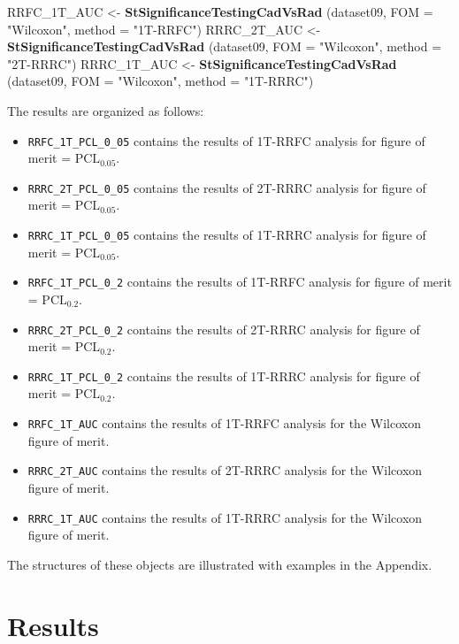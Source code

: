 \documentclass[
]{book}
\newenvironment{Shaded}{\begin{snugshade}}{\end{snugshade}}
\newcommand{\DataTypeTok}[1]{\textcolor[rgb]{0.13,0.29,0.53}{#1}}
\newcommand{\KeywordTok}[1]{\textcolor[rgb]{0.13,0.29,0.53}{\textbf{#1}}}
\newcommand{\NormalTok}[1]{#1}
\newcommand{\StringTok}[1]{\textcolor[rgb]{0.31,0.60,0.02}{#1}}
\begin{document}
\begin{Shaded}
\begin{Highlighting}[]
\NormalTok{RRFC_1T_AUC <-}\StringTok{ }\KeywordTok{StSignificanceTestingCadVsRad}\NormalTok{ (dataset09, }
\DataTypeTok{FOM =} \StringTok{"Wilcoxon"}\NormalTok{, }\DataTypeTok{method =} \StringTok{"1T-RRFC"}\NormalTok{)}
\NormalTok{RRRC_2T_AUC <-}\StringTok{ }\KeywordTok{StSignificanceTestingCadVsRad}\NormalTok{ (dataset09, }
\DataTypeTok{FOM =} \StringTok{"Wilcoxon"}\NormalTok{, }\DataTypeTok{method =} \StringTok{"2T-RRRC"}\NormalTok{)}
\NormalTok{RRRC_1T_AUC <-}\StringTok{ }\KeywordTok{StSignificanceTestingCadVsRad}\NormalTok{ (dataset09, }
\DataTypeTok{FOM =} \StringTok{"Wilcoxon"}\NormalTok{, }\DataTypeTok{method =} \StringTok{"1T-RRRC"}\NormalTok{)}
\end{Highlighting}
\end{Shaded}

The results are organized as follows:

\begin{itemize}
\item
  \texttt{RRFC\_1T\_PCL\_0\_05} contains the results of 1T-RRFC analysis for figure of merit = \(\text{PCL}_{0.05}\).
\item
  \texttt{RRRC\_2T\_PCL\_0\_05} contains the results of 2T-RRRC analysis for figure of merit = \(\text{PCL}_{0.05}\).
\item
  \texttt{RRRC\_1T\_PCL\_0\_05} contains the results of 1T-RRRC analysis for figure of merit = \(\text{PCL}_{0.05}\).
\item
  \texttt{RRFC\_1T\_PCL\_0\_2} contains the results of 1T-RRFC analysis for figure of merit = \(\text{PCL}_{0.2}\).
\item
  \texttt{RRRC\_2T\_PCL\_0\_2} contains the results of 2T-RRRC analysis for figure of merit = \(\text{PCL}_{0.2}\).
\item
  \texttt{RRRC\_1T\_PCL\_0\_2} contains the results of 1T-RRRC analysis for figure of merit = \(\text{PCL}_{0.2}\).
\item
  \texttt{RRFC\_1T\_AUC} contains the results of 1T-RRFC analysis for the Wilcoxon figure of merit.
\item
  \texttt{RRRC\_2T\_AUC} contains the results of 2T-RRRC analysis for the Wilcoxon figure of merit.
\item
  \texttt{RRRC\_1T\_AUC} contains the results of 1T-RRRC analysis for the Wilcoxon figure of merit.
\end{itemize}

The structures of these objects are illustrated with examples in the Appendix.

\hypertarget{standalone-cad-radiologists-results}{%
\section{Results}\label{standalone-cad-radiologists-results}}
\end{document}
